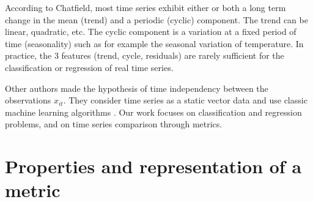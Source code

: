 \noindent According to Chatfield, most time series exhibit either or both a long term change in the mean (trend) and a periodic (cyclic) component. The trend can be linear, quadratic, etc. The cyclic component is a variation at a fixed period of time (seasonality) such as for example the seasonal variation of temperature. In practice, the 3 features (trend, cycle, residuals) are rarely sufficient for the classification or regression of real time series. 

Other authors made the hypothesis of time independency between the observations $x_{it}$. They consider time series as a static vector data and use classic machine learning algorithms \cite{Liang2012,Cao2001,Hu2013,Hwang2012}. Our work focuses on classification and regression problems, and on time series comparison through metrics.






\section{Properties and representation of a metric}
\label{sec:property_metric}

